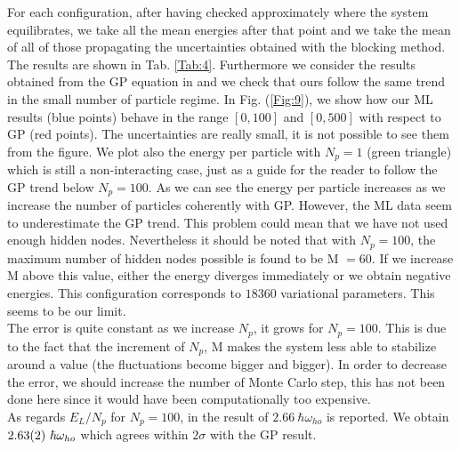 For each configuration, after having checked approximately where the system equilibrates, we take all the mean energies after that point and we take the mean of all of those propagating the uncertainties obtained with the blocking method. The results are shown in Tab. \ref{Tab:4}. 
Furthermore we consider the results obtained from the GP equation in \cite{DalfString} and we check that ours follow the same trend in the small number of particle regime. In Fig. (\ref{Fig:9}), we show how our ML results (blue points) behave in the range $[0,100]$ and $[0,500]$ with respect to GP (red points). The uncertainties are really small, it is not possible to see them from the figure. We plot also the energy per particle with $N_p=1$ (green triangle) which is still a non-interacting case, just as a guide for the reader to follow the GP trend below $N_p=100$. As we can see the energy per particle increases as we increase the number of particles coherently with GP. However, the ML data seem to underestimate the GP trend. This problem could mean that we have not used enough hidden nodes. Nevertheless it should be noted that with $N_p=100$, the maximum number of hidden nodes possible is found to be M $=60$. If we increase M above this value, either the energy diverges immediately or we obtain negative energies. This configuration corresponds to $18360$ variational parameters. This seems to be our limit.\\
The error is quite constant as we increase $N_p$, it grows for $N_p=100$. This is due to the fact that the increment of $N_p$, M makes the system less able to stabilize around a value (the fluctuations become bigger and bigger). In order to decrease the error, we should increase the number of Monte Carlo step, this has not been done here since it would have been computationally too expensive.\\
As regards $E_L/N_p$ for $N_p=100$, in \cite{DalfString} the result of $2.66\ \hbar\omega_{ho}$ is reported. We obtain $\SI{2.63\pm 0.02}{}\ \hbar\omega_{ho}$ which agrees within $2\sigma$ with the GP result. 

